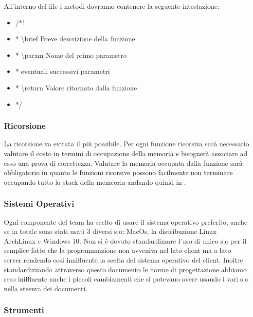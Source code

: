 All'interno del file i metodi dovranno contenere la seguente intestazione:
\begin{itemize}
\color{ForestGreen}
\item /*!
\item * \textbackslash brief Breve descrizione della funzione
\item * \textbackslash param Nome del primo parametro
\item *  eventuali successivi parametri
\item * \textbackslash return Valore ritornato dalla funzione
\item */
\end{itemize}
  
\subsubsection{Ricorsione}
La ricorsione va evitata il più possibile. Per ogni funzione ricorsiva sarà necessario valutare il costo in termini di occupazione della memoria e bisognerà associare ad esso una prova di correttezza.
Valutare la memoria occupata dalla funzione sarà obbligatorio in quanto le funzioni ricorsive possono facilmente non terminare occupando tutto lo stack della memeoria andando quinid in .

\subsubsection{Sistemi Operativi}
Ogni componente del team ha scelto di usare il sistema operativo preferito, anche se in totale sono stati usati 3 diversi s.o: MacOs, la distribuzione Linux ArchLinux e Windows 10. Non si è dovuto standardizzare l'uso di unico s.o per il semplice fatto che la programmazione non avveniva nel lato client ma a lato server rendendo cosi innifluente la scelta del sistema operativo del client. Inoltre standardizzando attraverso questo documento le norme di progettazione abbiamo reso iniffluente anche i piccoli cambiamenti che si potevano avere usando i vari s.o nella stesura dei documenti.



\subsubsection{Strumenti}
